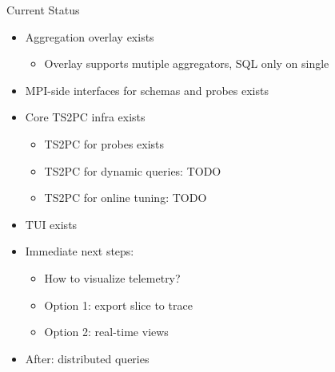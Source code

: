 \documentclass[
  ignorenonframetext,
]{beamer}
\providecommand{\tightlist}{%
  \setlength{\itemsep}{0pt}\setlength{\parskip}{0pt}}\usepackage{longtable,booktabs,array}
\begin{document}
\begin{frame}{Current Status}
\label{current-status}
\begin{itemize}
\tightlist
\item
  Aggregation overlay exists

  \begin{itemize}
  \tightlist
  \item
    Overlay supports mutiple aggregators, SQL only on single
  \end{itemize}
\end{itemize}

\pause

\begin{itemize}
\tightlist
\item
  MPI-side interfaces for schemas and probes exists
\end{itemize}

\pause

\begin{itemize}
\tightlist
\item
  Core TS2PC infra exists

  \begin{itemize}
  \tightlist
  \item
    TS2PC for probes exists
  \item
    TS2PC for dynamic queries: TODO
  \item
    TS2PC for online tuning: TODO
  \end{itemize}
\end{itemize}

\pause

\begin{itemize}
\tightlist
\item
  TUI exists
\end{itemize}

\pause

\begin{itemize}
\tightlist
\item
  Immediate next steps:

  \begin{itemize}
  \tightlist
  \item
    How to visualize telemetry?
  \item
    Option 1: export slice to trace
  \item
    Option 2: real-time views
  \end{itemize}
\end{itemize}

\pause

\begin{itemize}
\tightlist
\item
  After: distributed queries
\end{itemize}
\end{frame}
\end{document}
